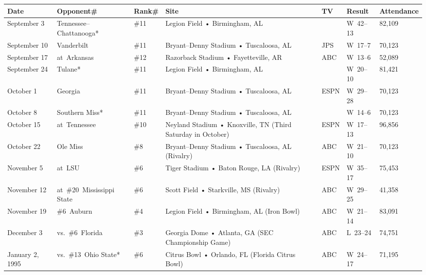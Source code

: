 \documentclass{article}
\begin{document}
\begin{tabular}{lllllll}
\toprule
Date & Opponent\# & Rank\# & Site & TV & Result & Attendance \\
\midrule
September 3 & Tennessee–Chattanooga* & \#11 & Legion Field • Birmingham, AL &  & W 42–13 & 82,109 \\
September 10 & Vanderbilt & \#11 & Bryant–Denny Stadium • Tuscaloosa, AL & JPS & W 17–7 & 70,123 \\
September 17 & at Arkansas & \#12 & Razorback Stadium • Fayetteville, AR & ABC & W 13–6 & 52,089 \\
September 24 & Tulane* & \#11 & Legion Field • Birmingham, AL &  & W 20–10 & 81,421 \\
October 1 & Georgia & \#11 & Bryant–Denny Stadium • Tuscaloosa, AL & ESPN & W 29–28 & 70,123 \\
October 8 & Southern Miss* & \#11 & Bryant–Denny Stadium • Tuscaloosa, AL &  & W 14–6 & 70,123 \\
October 15 & at Tennessee & \#10 & Neyland Stadium • Knoxville, TN (Third Saturday in October) & ESPN & W 17–13 & 96,856 \\
October 22 & Ole Miss & \#8 & Bryant–Denny Stadium • Tuscaloosa, AL (Rivalry) & ABC & W 21–10 & 70,123 \\
November 5 & at LSU & \#6 & Tiger Stadium • Baton Rouge, LA (Rivalry) & ESPN & W 35–17 & 75,453 \\
November 12 & at \#20 Mississippi State & \#6 & Scott Field • Starkville, MS (Rivalry) & ABC & W 29–25 & 41,358 \\
November 19 & \#6 Auburn & \#4 & Legion Field • Birmingham, AL (Iron Bowl) & ABC & W 21–14 & 83,091 \\
December 3 & vs. \#6 Florida & \#3 & Georgia Dome • Atlanta, GA (SEC Championship Game) & ABC & L 23–24 & 74,751 \\
January 2, 1995 & vs. \#13 Ohio State* & \#6 & Citrus Bowl • Orlando, FL (Florida Citrus Bowl) & ABC & W 24–17 & 71,195 \\
\bottomrule
\end{tabular}
\end{document}
